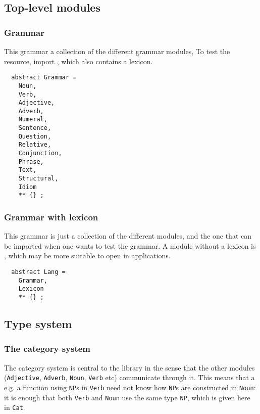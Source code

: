 \documentclass[11pt,a4paper]{article}
\newcommand{\commOut}[1]{}
\begin{document}
\subsection{Top-level modules}

\subsubsection{Grammar}
This grammar a collection of the different grammar modules,
To test the resource, import , which also contains
a lexicon.

\begin{verbatim}
  abstract Grammar = 
    Noun,
    Verb, 
    Adjective,
    Adverb,
    Numeral,
    Sentence, 
    Question,
    Relative,
    Conjunction,
    Phrase,
    Text,
    Structural,
    Idiom
    ** {} ;
\end{verbatim}

\commOut{Produced by 
gfdoc - a rudimentary GF document generator.
(c) Aarne Ranta (\htmladdnormallink{aarne@cs.chalmers.se}{mailto:aarne@cs.chalmers.se}) 2002 under GNU GPL.}


\subsubsection{Grammar with lexicon}
This grammar is just a collection of the different modules,
and the one that can be imported when one wants to test the
grammar. A module without a lexicon is ,
which may be more suitable to open in applications.

\begin{verbatim}
  abstract Lang = 
    Grammar,
    Lexicon
    ** {} ;
\end{verbatim}

\subsection{Type system}
\commOut{Produced by 
gfdoc - a rudimentary GF document generator.
(c) Aarne Ranta (\htmladdnormallink{aarne@cs.chalmers.se}{mailto:aarne@cs.chalmers.se}) 2002 under GNU GPL.}


\subsubsection{The category system}
The category system is central to the library in the sense
that the other modules (\texttt{Adjective}, \texttt{Adverb}, \texttt{Noun}, \texttt{Verb} etc)
communicate through it. This means that a e.g. a function using
\texttt{NP}s in \texttt{Verb} need not know how \texttt{NP}s are constructed in \texttt{Noun}:
it is enough that both \texttt{Verb} and \texttt{Noun} use the same type \texttt{NP},
which is given here in \texttt{Cat}.
\end{document}
